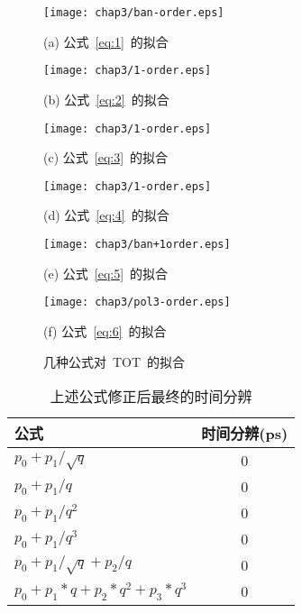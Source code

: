 \begin{figure}[h]
\begin{minipage}{0.5\linewidth}
  \centerline{\texttt{[image: chap3/ban-order.eps]}}
  \centerline{(a) 公式~\ref{eq:1}~的拟合}
  \centerline{\label{fig:ban-order}}
\end{minipage}
\hfill
\begin{minipage}{0.5\linewidth}
  \centerline{\texttt{[image: chap3/1-order.eps]}}
  \centerline{(b) 公式~\ref{eq:2}~的拟合}
  \centerline{\label{fig:1-order}}
\end{minipage}
\vfill
\begin{minipage}{0.5\linewidth}
  \centerline{\texttt{[image: chap3/1-order.eps]}}
  \centerline{(c) 公式~\ref{eq:3}~的拟合}
  \centerline{\label{fig:2-order}}
\end{minipage}
\hfill
\begin{minipage}{0.5\linewidth}
  \centerline{\texttt{[image: chap3/1-order.eps]}}
  \centerline{(d) 公式~\ref{eq:4}~的拟合}
  \centerline{\label{fig:3-order}}
\end{minipage}
\vfill
\begin{minipage}{0.5\linewidth}
  \centerline{\texttt{[image: chap3/ban+1order.eps]}}
  \centerline{(e) 公式~\ref{eq:5}~的拟合}
  \centerline{\label{fig:ban+1order}}
\end{minipage}
\hfill
\begin{minipage}{0.5\linewidth}
  \centerline{\texttt{[image: chap3/pol3-order.eps]}}
  \centerline{(f) 公式~\ref{eq:6}~的拟合}
  \centerline{\label{fig:pol3-order}}
\end{minipage}
\caption{几种公式对~TOT~的拟合}
\label{fig:res}
\end{figure}

\begin{table}[h]
    \centering
    \caption{\label{tbl:resolution} 上述公式修正后最终的时间分辨}
  \footnotesize
    \begin{tabular}{lc}
        \hline
        公式& 时间分辨(ps) \\
        \hline
        ${p_{0}+p_{1}/\sqrt{q}}$ & 0 \\
        ${p_{0}+p_{1}/q}$ & 0 \\
        ${p_{0}+p_{1}/q^{2}}$ & 0 \\
        ${p_{0}+p_{1}/q^{3}}$ & 0 \\
        ${p_{0}+p_{1}/\sqrt{q}+p_{2}/q}$ & 0 \\
        ${p_{0}+p_{1}*q+p_{2}*q^{2}+p_{3}*q^3}$ & 0 \\
        \hline
    \end{tabular}
\end{table}

